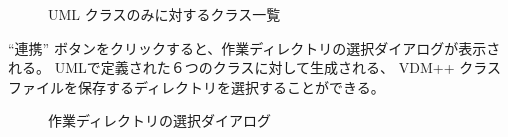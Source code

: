 \documentclass[\pformat,12pt]{jarticle}
\newcommand{\vdmpp}{VDM++}
\begin{document}
\begin{figure}[htb]
\begin{center}
\mbox{}
\caption{UML クラスのみに対するクラス一覧　\label{fig:UMLtoVDM}}
\end{center}
\end{figure}

\newpage

 ``連携'' ボタンをクリックすると、作業ディレクトリの選択ダイアログが表示される。
UMLで定義された６つのクラスに対して生成される、 \vdmpp{} クラスファイルを保存するディレクトリを選択することができる。

\begin{figure}[!htb]
\begin{center}
\mbox{}
\caption{作業ディレクトリの選択ダイアログ　\label{fig:selectDirectory}}
\end{center}
\end{figure}
\end{document}
